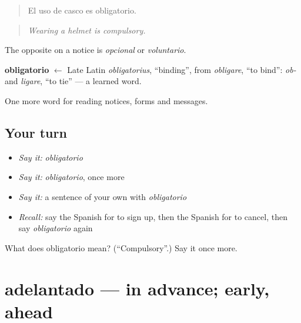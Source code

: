 \begin{quote}
El uso de casco es obligatorio.
\end{quote}

\begin{quote}
\emph{Wearing a helmet is compulsory.}
\end{quote}

The opposite on a notice is \emph{opcional} or \emph{voluntario}.

\begin{cousinweb}
\textbf{obligatorio} $\leftarrow$ Late Latin \emph{obligatorius}, \textquotedblleft{}binding\textquotedblright{}, from \emph{obligare}, \textquotedblleft{}to bind\textquotedblright{}: \emph{ob-} and \emph{ligare}, \textquotedblleft{}to tie\textquotedblright{} — a learned word.
\end{cousinweb}

\begin{grammarlens}[title={What you've built}]
One more word for reading notices, forms and messages.
\end{grammarlens}

\subsection*{Your turn}
\begin{itemize}
\raggedright
  \item \emph{Say it:} \emph{obligatorio}
  \item \emph{Say it:} \emph{obligatorio}, once more
  \item \emph{Say it:} a sentence of your own with \emph{obligatorio}
  \item \emph{Recall:} say the Spanish for to sign up, then the Spanish for to cancel, then say \emph{obligatorio} again
\end{itemize}

\begin{tcolorbox}[breakable,colback=teal!4,colframe=teal!35!black,title={Before you move on}]
What does obligatorio mean? (\textquotedblleft{}Compulsory\textquotedblright{}.) Say it once more.
\end{tcolorbox}
\section[adelantado]{adelantado — in advance; early, ahead}

\label{lesson:ES-C479-adelantado}



